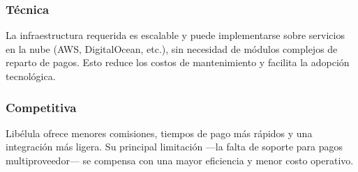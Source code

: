       \subsubsection{Técnica}
        La infraestructura requerida es escalable y puede implementarse sobre servicios en la nube (AWS, DigitalOcean, etc.), 
      sin necesidad de módulos complejos de reparto de pagos. Esto reduce los costos de mantenimiento y facilita la 
      adopción tecnológica.\par
      
      \subsubsection{Competitiva}
        Libélula ofrece menores comisiones, tiempos de pago más rápidos y una integración más ligera. Su principal 
      limitación ---la falta de soporte para pagos multiproveedor--- se compensa con una mayor eficiencia y menor costo 
      operativo.\par